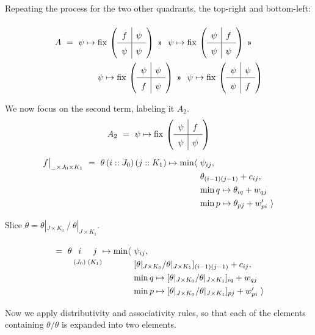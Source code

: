 \documentclass{article}
\begin{document}
Repeating the process for the two other quadrants, the top-right and bottom-left:

\[
\renewcommand\arraystretch{3}
\begin{array}{l@{}l}
A ~=~ \psi\mapsto{} & \mathrm{fix}\,\left( \quadrants{f}{\psi}{\psi}{\psi} \right)
        ~\applt~~ 
        \psi\mapsto\mathrm{fix}\,\left( \quadrants{\psi}{f}{\psi}{\psi} \right)
        ~\applt~ \\
      & \psi\mapsto\mathrm{fix}\,\left( \quadrants{\psi}{\psi}{f}{\psi} \right)
        ~\applt~~ 
        \psi\mapsto\mathrm{fix}\,\left( \quadrants{\psi}{\psi}{\psi}{f} \right)
\end{array}
\]

We now focus on the second term, labeling it $A_2$.
%
\[A_2 ~=~ \psi\mapsto \mathrm{fix}\,\left(\quadrants{\psi}{f}{\psi}{\psi}\right)\]
\[\begin{array}{l@{}l}
  f\big|_{\_\times J_0\times K_1} ~=~ \theta\,(i::J_0)\,(j::K_1)\mapsto\min\langle~
    & \psi_{ij}, \\
    & \theta_{(i-1)(j-1)} + c_{ij}, \\
    & \min q\mapsto \theta_{iq} + w_{qj} \\
    & \min p\mapsto \theta_{pj} + w'_{pi}~\rangle
\end{array}\]

Slice $\theta = \theta|_{J\times K_0} ~/~ \theta|_{J\times K_1}$.

\[\renewcommand\arraystretch{1.3}
  \begin{array}{l@{\,}c@{\,}c@{}l@{}l}
  ~=~ \theta & i & j & \mapsto\min\langle~
        & \psi_{ij}, \\
    & ^{(J_0)} & ^{(K_1)} & & [\theta|_{J\times K_0} / \theta|_{J\times K_1}]_{(i-1)(j-1)} + c_{ij}, \\
    &          &          & & \min q\mapsto [\theta|_{J\times K_0} / \theta|_{J\times K_1}]_{iq} + w_{qj} \\
    &          &          & & \min p\mapsto [\theta|_{J\times K_0} / \theta|_{J\times K_1}]_{pj} + w'_{pi}~\rangle
\end{array}\]

Now we apply distributivity and associativity rules, so that each of the elements containing 
$\theta/\theta$ is expanded into two elements.
\end{document}
